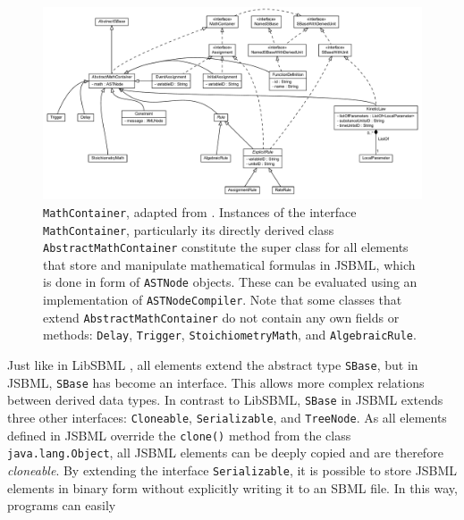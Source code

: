\documentclass[
  BCOR12mm,
  letterpaper,
  11pt,
  headsepline,
  pointlessnumbers,
  tablecaptionabove,
  onelinecaption,
  headinclude,
  appendixprefix,
  idxtotoc,
  bibtotoc,
  twoside,
  titlepage
]{scrartcl}
\begin{document}
\begin{figure}[htb]
 \centering
 \includegraphics[width=\textwidth]{img/MathContainer}
 \caption[\texttt{MathContainer}]{\texttt{MathContainer}, adapted from \citep{Draeger2011}. Instances of the interface \texttt{MathContainer}, particularly its directly derived class \texttt{AbstractMathContainer} constitute the super class for all elements that store and manipulate mathematical formulas in JSBML, which is done in form of \texttt{ASTNode} objects. These can be evaluated using an implementation of \texttt{ASTNodeCompiler}. Note that some classes that extend \texttt{AbstractMathContainer} do not contain any own fields or methods: \texttt{Delay}, \texttt{Trigger}, \texttt{StoichiometryMath}, and \texttt{AlgebraicRule}.}
 \label{fig:MathContainerHierarchy}
\end{figure}
Just like in LibSBML \citep{Bornstein2008}, all elements extend the abstract type \texttt{SBase}, but in
JSBML, \texttt{SBase} has become an interface. This allows more complex relations
between derived data types. In contrast to LibSBML, \texttt{SBase} in JSBML
extends three other interfaces: \texttt{Cloneable}, \texttt{Serializable},
and \texttt{TreeNode}. As all elements defined in JSBML override the \texttt{clone()}
method from the class \texttt{java.lang.Object}, all JSBML elements can be deeply
copied and are therefore \emph{cloneable}. By extending the interface
\texttt{Serializable},
it is possible to store JSBML elements in binary form
without explicitly writing it to an SBML file. In this way, programs can easily
\end{document}
